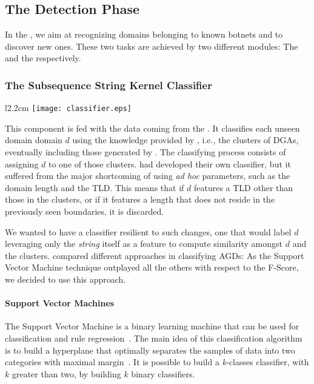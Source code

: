 

\subsection{The Detection Phase} %
\label{sub:dga_detection}
In the , we aim at recognizing domains belonging to known botnets
and to discover new ones. These two tasks are achieved by two different modules: The
 and the  respectively.

\subsubsection{The Subsequence String Kernel Classifier} %
\label{ssub:ssk_classifier}
\begin{wrapfigure}{l}{2.2cm}
\centering
    \texttt{[image: classifier.eps]}
\end{wrapfigure}
This component is fed with the data coming from the .
It classifies each unseen domain domain $d$ using the knowledge provided
by \phoenix, i.e., the clusters of DGAs, eventually including those generated by \thesystem. The classifying process consists of assigning
$d$ to one of those clusters.
\citet{schiavoni2013} had developed their own classifier, but it suffered from the major
shortcoming of using \emph{ad hoc} parameters, such as the domain length and the TLD.
This means that if $d$ features a TLD other than those in the clusters, or if it
features a length that does not reside in the previously seen boundaries, it is discarded.

We wanted to have a classifier resilient to such changes, one that would label $d$ leveraging
only the \emph{string} itself as a feature to compute similarity amongst $d$ and the clusters.
\citet{haddadi2013malicious} compared different approaches in classifying AGDs: As the Support
Vector Machine technique outplayed all the others with respect to the F-Score,
we decided to use this approach.

\paragraph{Support Vector Machines} %
\label{par:support_vector_machines}
The Support Vector Machine is a binary learning machine that can be used for classification
and rule regression~\cite{alpaydin2004introduction}. The main idea of this classification
algorithm is to build a hyperplane that optimally separates the samples of data into two
categories with maximal margin~\cite{haddadi2013malicious}. It is possible to build a
\emph{k}-classes classifier, with $k$ greater than two, by building $k$ binary classifiers.

